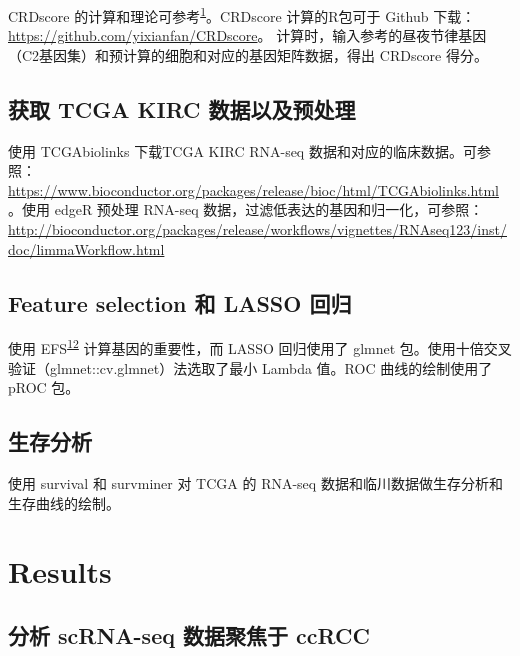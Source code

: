 \documentclass[
]{article}
\begin{document}
CRDscore 的计算和理论可参考\textsuperscript{\protect\hyperlink{ref-SingleCellTraHeLe2022}{1}}。CRDscore 计算的R包可于 Github 下载：\url{https://github.com/yixianfan/CRDscore}。
计算时，输入参考的昼夜节律基因（C2基因集）和预计算的细胞和对应的基因矩阵数据，得出 CRDscore 得分。

\hypertarget{ux83b7ux53d6-tcga-kirc-ux6570ux636eux4ee5ux53caux9884ux5904ux7406}{%
\subsection{获取 TCGA KIRC 数据以及预处理}\label{ux83b7ux53d6-tcga-kirc-ux6570ux636eux4ee5ux53caux9884ux5904ux7406}}

使用 TCGAbiolinks 下载TCGA KIRC RNA-seq 数据和对应的临床数据。可参照：\url{https://www.bioconductor.org/packages/release/bioc/html/TCGAbiolinks.html}。使用 edgeR 预处理 RNA-seq 数据，过滤低表达的基因和归一化，可参照：\url{http://bioconductor.org/packages/release/workflows/vignettes/RNAseq123/inst/doc/limmaWorkflow.html}

\hypertarget{feature-selection-ux548c-lasso-ux56deux5f52}{%
\subsection{Feature selection 和 LASSO 回归}\label{feature-selection-ux548c-lasso-ux56deux5f52}}

使用 EFS\textsuperscript{\protect\hyperlink{ref-EfsAnEnsemblNeuman2017}{12}} 计算基因的重要性，而 LASSO 回归使用了 glmnet 包。使用十倍交叉验证（glmnet::cv.glmnet）法选取了最小 Lambda 值。ROC 曲线的绘制使用了 pROC 包。

\hypertarget{ux751fux5b58ux5206ux6790}{%
\subsection{生存分析}\label{ux751fux5b58ux5206ux6790}}

使用 survival 和 survminer 对 TCGA 的 RNA-seq 数据和临川数据做生存分析和生存曲线的绘制。

\hypertarget{results}{%
\section{Results}\label{results}}

\hypertarget{focus}{%
\subsection{分析 scRNA-seq 数据聚焦于 ccRCC}\label{focus}}
\end{document}
